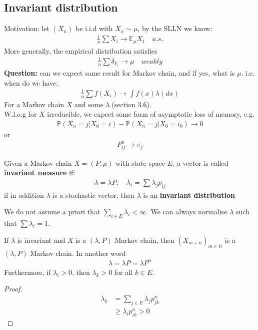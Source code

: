 \begin{example}[M/G/1 quene]
	
\end{example}



\subsection{Invariant distribution}
Motivation: let $(X_n)$ be i.i.d with $X_n \sim \mu$, by the SLLN we know:
\begin{align*}
	\frac{1}{n} \sum X_i \rightarrow \mathbb{E}_\mu X_1 \quad a.s.
\end{align*}
More generally, the empirical distribution satisfies 
\begin{align*}
	\frac{1}{n} \sum \delta_{Y_i} \rightarrow \mu \quad weakly
\end{align*}
\textbf{Question:} can we expect same result for Markov chain, and if yes, what is $\mu$. i.e. when do we have:
\begin{align*}
	\frac{1}{n} \sum f(X_i) \rightarrow \int f(x) \lambda(dx)
\end{align*}
For a Markov chain $X$ and some $\lambda$.(section 3.6).\\
W.l.o.g for $X$ irreducible, we expect some form of asymptotic loss of memory, e.g.
\begin{align*}
	\mathbb{P}(X_n = j| X_0 = i) - \mathbb{P}(X_n = j| X_0 = i_0) \rightarrow 0
\end{align*}
or 
\begin{align*}
	P_{ij}^n \rightarrow \pi_j
\end{align*}
\begin{definition}
	Given a Markov chain $X = (P, \mu)$ with state space $E$, a vector is called \textbf{invariant measure} if:
	\begin{align*}
		\lambda = \lambda P, \quad \lambda_i = \sum \lambda_j p_{ij}
	\end{align*}
	if in addition $\lambda$ is a stochastic vector, then $\lambda$ is an \textbf{invariant distribution}
\end{definition}
\begin{remark}
We do not assume a priori that $\sum_{i \in E} \lambda_i< \infty$. We can always normalise $\lambda$ such that $\sum \lambda_i = 1$.	
\end{remark}

\begin{lemma}
	If $\lambda$ is invariant and $X$ is a $(\lambda, P)$ Markov chain, then $(X_{m+n})_{m \in \mathbb{N}}$ is a $(\lambda, P)$ Markov chain. In another word
	\begin{align*}
		\lambda = \lambda P = \lambda P^n
	\end{align*}
	Furthermore, if $\lambda_i > 0$, then $\lambda_k > 0$ for all $k \in E$.
\end{lemma}
\begin{proof}
	\begin{align*}
		\lambda_k &= \sum_{j \in E} \lambda_j p_{jk}^n\\
		&\ge \lambda_i p_{ik}^n > 0
	\end{align*}
\end{proof}

